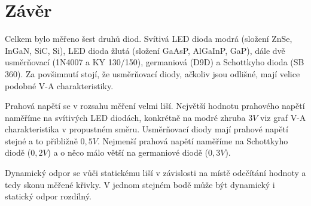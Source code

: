 \documentclass[12pt]{article} %
\begin{document}
\section{Závěr}
Celkem bylo měřeno šest druhů diod. Svítivá LED dioda modrá (složení ZnSe, InGaN, SiC, Si), LED dioda žlutá (složení GaAsP, AlGaInP, GaP), dále dvě usměrňovací (1N4007 a KY 130/150), germaniová (D9D) a Schottkyho dioda (SB 360). Za povšimnutí stojí, že usměrňovací diody, ačkoliv jsou odlišné, mají velice podobné V-A charakteristiky.

Prahová napětí se v rozsahu měření velmi liší. Největší hodnotu prahového napětí naměříme na svítivých LED diodách, konkrétně na modré zhruba $3V$ viz graf V-A charakteristika v propustném směru. Usměrňovací diody mají prahové napětí stejné a to přibližně $0,5V$. Nejmenší prahová napětí naměříme na Schottkyho diodě ($0,2V$) a o něco málo větší na germaniové diodě ($0,3V$).

Dynamický odpor se vůči statickému liší v závislosti na místě odečítání hodnoty a tedy skonu měřené křivky. V jednom stejném bodě může být dynamický i statický odpor rozdílný.
\end{document}
